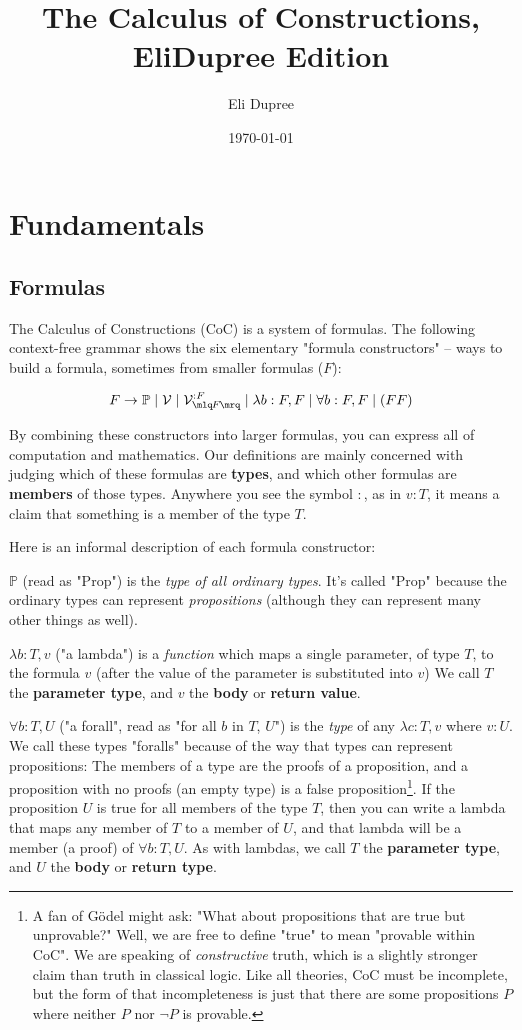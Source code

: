 \documentclass{article}
\title{The Calculus of Constructions, EliDupree Edition}
\author{Eli Dupree}
\date{\today}
\newcommand{\Prop}{\mathbb{P}}
\newcommand{\usage}{\mathcal{V}}
\newcommand{\usageKnown}[2]{{\usage_{\mlq\hspace{-0.06em}#2\hspace{-0.06em}\mrq}^{:#1}}}
\begin{document}
  \maketitle

  \section{Fundamentals}
  \subsection{Formulas}

  The Calculus of Constructions (CoC) is a system of formulas. The following context-free grammar shows the six elementary "formula constructors" – ways to build a formula, sometimes from smaller formulas ($F$):

  \[ F \rightarrow \Prop \mid \usage \mid \usageKnown{F}{F} \mid \lambda b:F,F \mid \forall b:F,F \mid (F F) \]
  
  By combining these constructors into larger formulas, you can express all of computation and mathematics. Our definitions are mainly concerned with judging which of these formulas are \textbf{types}, and which other formulas are \textbf{members} of those types. Anywhere you see the symbol $:$, as in $v : T$, it means a claim that something is a member of the type $T$.

  Here is an informal description of each formula constructor:

  $\Prop$ (read as "Prop") is the \emph{type of all ordinary types}. It's called "Prop" because the ordinary types can represent \emph{propositions} (although they can represent many other things as well).
  
  $\lambda b:T,v$ ("a lambda") is a \emph{function} which maps a single parameter, of type $T$, to the formula $v$ (after the value of the parameter is substituted into $v$) We call $T$ the \textbf{parameter type}, and $v$ the \textbf{body} or \textbf{return value}.
  
  $\forall b:T,U$ ("a forall", read as "for all $b$ in $T$, $U$") is the \emph{type} of any $\lambda c:T,v$ where $v : U$. We call these types "foralls" because of the way that types can represent propositions: The members of a type are the proofs of a proposition, and a proposition with no proofs (an empty type) is a false proposition\footnote{A fan of Gödel might ask: "What about propositions that are true but unprovable?" Well, we are free to define "true" to mean "provable within CoC". We are speaking of \emph{constructive} truth, which is a slightly stronger claim than truth in classical logic. Like all theories, CoC must be incomplete, but the form of that incompleteness is just that there are some propositions $P$ where neither $P$ nor $\neg P$ is provable.}. If the proposition $U$ is true for all members of the type $T$, then you can write a lambda that maps any member of $T$ to a member of $U$, and that lambda will be a member (a proof) of $\forall b:T,U$. As with lambdas, we call $T$ the \textbf{parameter type}, and $U$ the \textbf{body} or \textbf{return type}.
  
\end{document}

